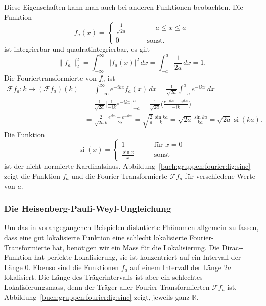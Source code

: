 Diese Eigenschaften kann man auch bei anderen Funktionen beobachten.
Die Funktion
\[
f_a(x)
=
\begin{cases}
\frac1{\sqrt{2a}}&\qquad -a\le x \le a\\
0&\qquad\text{sonst}.
\end{cases}
\]
ist integrierbar und quadratintegrierbar, es gilt
\[
\|f_a\|_2^2
=
\int_{-\infty}^\infty
|f_a(x)|^2
\,dx
=
\int_{-a}^a \frac{1}{2a} \,dx
=
1.
\]
Die Fouriertransformierte von $f_a$ ist
\begin{align*}
\mathscr{F}f_a
\colon k\mapsto
(\mathscr{F}f_a)(k)
&=
\int_{-\infty}^\infty e^{-ikx} f_a(x)\,dx
=
\frac{1}{\sqrt{2a}}
\int_{-a}^a e^{-ikx}\,dx
\\
&=
\frac{1}{\sqrt{2a}}
\biggl[
\frac{1}{-ik} e^{-ikx}
\biggr]_{-a}^a
=
\frac{1}{\sqrt{2a}}\biggl(
\frac{
e^{-ika}-e^{ika}
}{
-ik
}
\biggr)
\\
&=
\frac{2}{\sqrt{2a}k}\frac{e^{ika}-e^{-ika}}{2i}
=
\sqrt{\frac{2}{a}} \frac{\sin ka}{k}
=
\sqrt{2a} \frac{\sin ka}{ka}
=
\sqrt{2a}
\operatorname{si}(ka).
\end{align*}
Die Funktion
\[
\operatorname{si}(x)
=
\begin{cases}
1&\qquad \text{für $x = 0$}\\
\displaystyle\frac{\sin x}{x}&\qquad\text{sonst}
\end{cases}
\]
ist der nicht normierte Kardinalsinus.
Abbildung~\ref{buch:gruppen:fourier:fig:sinc} zeigt die Funktion 
$f_a$ und die Fourier-Transformierte $\mathscr{F}f_a$ für verschiedene
Werte von $a$.



%
%
\subsubsection{Die Heisenberg-Pauli-Weyl-Ungleichung}
Um das in vorangegangenen Beispielen diskutierte Phänomen allgemein
zu fassen, dass eine gut lokalisierte Funktion eine schlecht lokalisierte
Fourier-Transformierte hat, benötigen wir ein Mass für die Lokalisierung.
Die Dirac-\textdelta-Funktion hat perfekte Lokalisierung, sie ist 
konzentriert auf ein Intervall der Länge $0$.
Ebenso sind die Funktionen $f_a$ auf einem Intervall der Länge $2a$
lokalisiert.
Die Länge des Trägerintervalls ist aber ein schlechtes Lokalisierungsmass,
denn der Träger aller Fourier-Transformierten $\mathscr{F}f_a$ ist,
Abbildung~\ref{buch:gruppen:fourier:fig:sinc} zeigt,
jeweils ganz $\mathbb{R}$.

